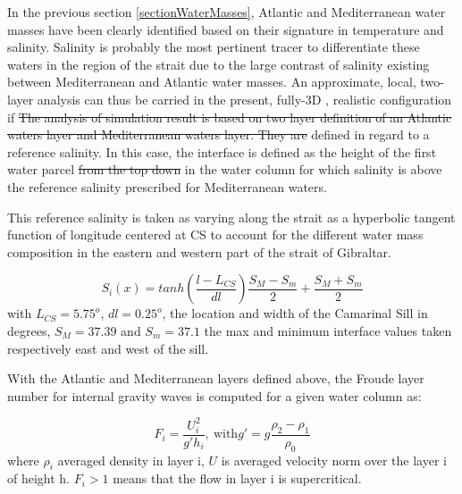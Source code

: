 In the previous section \ref{sectionWaterMasses}, Atlantic and Mediterranean water masses have been clearly identified based on their signature in temperature and salinity. Salinity is probably the most pertinent tracer to differentiate these waters in the region of the strait due to the large contrast of salinity existing between Mediterranean and Atlantic water masses.
An approximate, local, two-layer analysis can thus be carried in the present, fully-3D , realistic configuration if
\color{black}
\sout{The analysis of simulation result is based on two layer definition of an Atlantic waters layer and Mediterranean waters layer. They are} defined in regard to a reference salinity. In this case, the interface is defined as the height of the first water parcel \sout{from the top down} in the water column for which salinity is above the reference salinity prescribed for Mediterranean waters.

This reference salinity is taken as varying along the strait as a hyperbolic tangent function of longitude centered at CS to account for the different water mass composition in the eastern and western part of the strait of Gibraltar. 

\begin{equation}
	S_i(x)=tanh(\frac{l-L_{CS}}{dl})\frac{S_M-S_m}{2}+\frac{S_M+S_m}{2}
\end{equation}
with $L_{CS}=5.75^o$, $dl=0.25^o$, the location and width of the Camarinal Sill in degrees, $S_M=37.39$ and $S_m=37.1$ the max and minimum interface values taken respectively east and west of the sill.

With the Atlantic and Mediterranean layers defined above, the Froude layer number for internal gravity waves is computed for \color{blue} a given water column as\color{black}: 

\begin{equation}
F_i=\frac{U_i^2}{g'h_i} , \ \text{with} g'=g \frac{\rho_2-\rho_1}{\rho_0}
\end{equation}
where $\rho_i$ averaged density in layer i,  $U$ is averaged velocity norm over the layer i of height h. $F_i>1$ means that the flow in layer i is supercritical.


